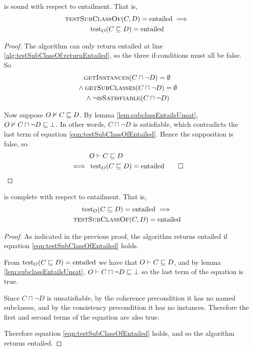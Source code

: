 \documentclass[paper.tex]{subfiles}
\begin{document}
\begin{proposition}
  \label{prop:testSubClassOfEntailedSound}
   is sound with respect to entailment.  That is,
  \begin{multline*}
    \Call{testSubClassOf}{C, D} = \mathrm{entailed} \implies \\
    \test_O(C \sqsubseteq D) = \mathrm{entailed}
  \end{multline*}
\end{proposition}
\begin{proof}
  The algorithm can only return entailed at line \ref{alg:testSubClassOf:returnEntailed}, so the three if-conditions must all be false.  So
  \begin{multline}
    \label{eqn:testSubClassOfEntailed}
    \Call{getInstances}{C \sqcap \neg D} = \emptyset \\
    {} \land \Call{getSubClasses}{C \sqcap \neg D} = \emptyset \\
    {} \land \lnot \Call{isSatisfiable}{C \sqcap \neg D}
  \end{multline}

  Now suppose $O \nvdash C \sqsubseteq D$.  By lemma \ref{lem:subclassEntailsUnsat}, $O \nvdash C \sqcap \neg D \sqsubseteq \bot$.  In other words, $C \sqcap \neg D$ is satisfiable, which contradicts the last term of equation \ref{eqn:testSubClassOfEntailed}.  Hence the supposition is false, so
  \begin{align*}
    & O \vdash C \sqsubseteq D \\
    \iff{}& \operatorname{test}_O(C \sqsubseteq D) = \mathrm{entailed}
    \qed
  \end{align*}
\end{proof}

\begin{proposition}
  \label{prop:testSubClassOfEntailedComplete}
   is complete with respect to entailment.  That is,
  \begin{multline*}
    \test_O(C \sqsubseteq D) = \mathrm{entailed} \implies \\
    \Call{testSubClassOf}{C, D} = \mathrm{entailed}
  \end{multline*}
\end{proposition}
\begin{proof}
  As indicated in the previous proof, the algorithm returns entailed if equation \ref{eqn:testSubClassOfEntailed} holds.

  From $\operatorname{test}_O(C \sqsubseteq D) = \mathrm{entailed}$ we have that $O \vdash C \sqsubseteq D$, and by lemma \ref{lem:subclassEntailsUnsat}, $O \vdash C \sqcap \neg D \sqsubseteq \bot$ so the last term of the equation is true.

  Since $C \sqcap \neg D$ is unsatisfiable, by the coherence precondition it has no named subclasses, and by the consistency precondition it has no instances.  Therefore the first and second terms of the equation are also true.

  Therefore equation \ref{eqn:testSubClassOfEntailed} holds, and so the algorithm returns entailed.
\end{proof}
\end{document}
